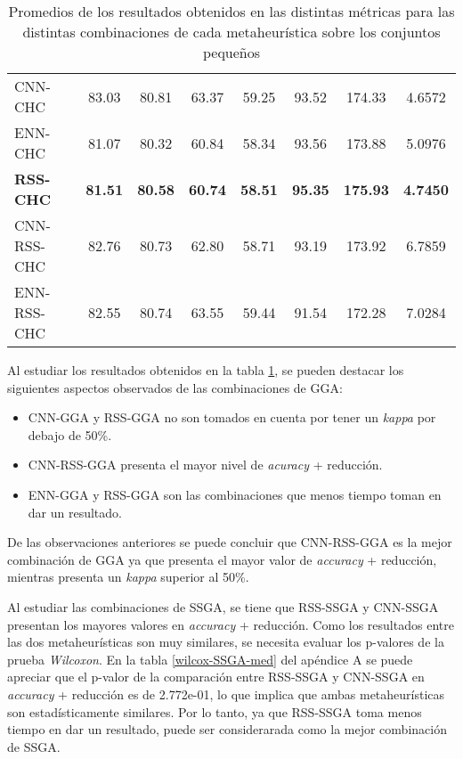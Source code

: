 \begin{table}[h!]
\begin{adjustbox}{max width =\textwidth}
\begin{tabular}{l c c c c c c c}
\hline

CNN-CHC & 83.03 & 80.81 & 63.37 & 59.25 & 93.52 & 174.33 & 4.6572 \\
ENN-CHC & 81.07 & 80.32 & 60.84 & 58.34 & 93.56 & 173.88 & 5.0976 \\
\textbf{RSS-CHC} & \textbf{81.51} & \textbf{80.58} & \textbf{60.74} & \textbf{58.51} & \textbf{95.35} & \textbf{175.93} & \textbf{4.7450} \\
CNN-RSS-CHC & 82.76 & 80.73 & 62.80 & 58.71 & 93.19 & 173.92 & 6.7859 \\
ENN-RSS-CHC  & 82.55 & 80.74 & 63.55 & 59.44 & 91.54 & 172.28 & 7.0284 \\


\hline
\end{tabular}
\end{adjustbox}
\caption{Promedios de los resultados obtenidos en las distintas métricas para las distintas combinaciones de cada metaheurística sobre los conjuntos pequeños}
\label{med-all}

\end{table}

Al estudiar los resultados obtenidos en la tabla \ref{med-all}, se pueden destacar los siguientes aspectos observados de las combinaciones de GGA:

\begin{itemize}

\item CNN-GGA y RSS-GGA no son tomados en cuenta por tener un \emph{kappa} por debajo de 50\%.

\item CNN-RSS-GGA presenta el mayor nivel de \emph{acuracy} + reducción.

\item ENN-GGA y RSS-GGA son las combinaciones que menos tiempo toman en dar un resultado.

\end{itemize}

De las observaciones anteriores se puede concluir que CNN-RSS-GGA es la mejor combinación de GGA ya que presenta el mayor valor de \emph{accuracy} + reducción, mientras presenta un \emph{kappa} superior al 50\%.

Al estudiar las combinaciones de SSGA, se tiene que RSS-SSGA y CNN-SSGA presentan los mayores valores en \emph{accuracy} + reducción. Como los resultados entre las dos metaheurísticas son muy similares, se necesita evaluar los p-valores de la prueba \emph{Wilcoxon}. En la tabla \ref{wilcox-SSGA-med} del apéndice A se puede apreciar que el p-valor de la comparación entre RSS-SSGA y CNN-SSGA en \emph{accuracy} + reducción es de 2.772e-01, lo que implica que ambas metaheurísticas son estadísticamente similares. Por lo tanto, ya que RSS-SSGA toma menos tiempo en dar un resultado, puede ser considerarada como la mejor combinación de SSGA.

